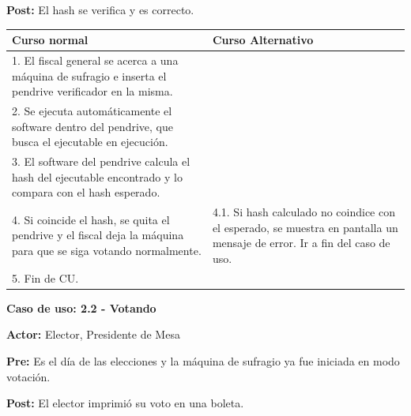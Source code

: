 \textbf{Post:} El hash se verifica y es correcto.

\begin{table}[h!]
	
 \begin{tabular}{|p{7.5cm} | p{7.5cm}|} 
 \hline
 \textbf{Curso normal} & \textbf{Curso Alternativo} \\
 \hline
	

1. El fiscal general se acerca a una máquina de sufragio e inserta el pendrive verificador en la misma. & \\
 \hline
2. Se ejecuta automáticamente el software dentro del pendrive, que busca el ejecutable en ejecución.& \\


3. El software del pendrive calcula el hash del ejecutable encontrado y lo compara con el hash esperado. & \\
\hline

4. Si coincide el hash, se quita el pendrive y el fiscal deja la máquina para que se siga votando normalmente. &
4.1. Si hash calculado no coindice con el esperado, se muestra en pantalla un mensaje de error. Ir a fin del caso de uso. \\
\hline
5. Fin de CU. & \\
\hline
\end{tabular}
\end{table}

\textbf{Caso de uso: 2.2 - Votando}

\textbf{Actor:} Elector, Presidente de Mesa

\textbf{Pre:} Es el día de las elecciones y la máquina de sufragio ya fue iniciada en modo votación.

\textbf{Post:} El elector imprimió su voto en una boleta.

\newpage

